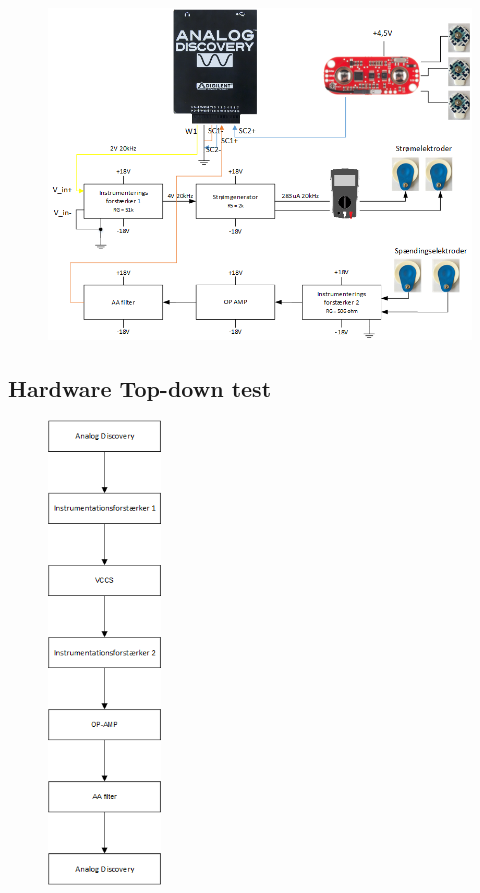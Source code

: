 \begin{figure}[H] 
\centering
{\includegraphics[width=\linewidth]
{Figure/integrationstestDiagram}}
\caption{}
\label{fig:integrationstestDiagram}
\end{figure}


\subsection{Hardware Top-down test}



\begin{figure}[H] 
\centering
{\includegraphics[width=3cm]
{Figure/integrationstestTopdowntest}}
\caption{}
\label{fig:integrationstestTopdowntest}
\end{figure}

